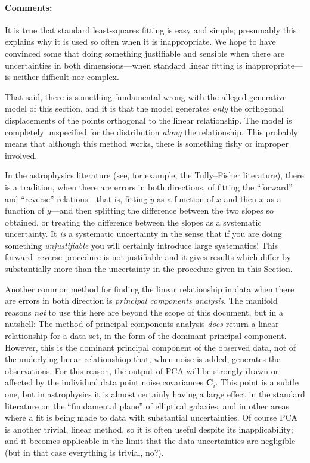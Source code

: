 \documentclass[12pt]{article}
\newcommand{\sectionname}{Section}
\newcommand{\commentsname}{Comments}
\newenvironment{comments}{\paragraph{\commentsname:}}{}
\newcommand{\mmatrix}[1]{\boldsymbol{#1}}
\newcommand{\mC}{\mmatrix{C}}
\begin{document}
\begin{comments}
It is true that standard least-squares fitting is easy and simple;
presumably this explains why it is used so often when it is
inappropriate.  We hope to have convinced some that doing something
justifiable and sensible when there are uncertainties in both
dimensions---when standard linear fitting is inappropriate---is
neither difficult nor complex.

That said, there is something fundamental wrong with the alleged
generative model of this section, and it is that the model generates
\emph{only} the orthogonal displacements of the points orthogonal to
the linear relationship.  The model is completely unspecified for the
distribution \emph{along} the relationship.  This probably means that
although this method works, there is something fishy or improper
involved.

In the astrophysics literature (see, for example, the Tully--Fisher
literature), there is a tradition, when there are errors in both
directions, of fitting the ``forward'' and ``reverse''
relations---that is, fitting $y$ as a function of $x$ and then $x$ as
a function of $y$---and then splitting the difference between the two
slopes so obtained, or treating the difference between the slopes as a
systematic uncertainty.  It \emph{is} a systematic uncertainty in the
sense that if you are doing something \emph{unjustifiable} you will
certainly introduce large systematics!  This forward--reverse
procedure is not justifiable and it gives results which differ by
substantially more than the uncertainty in the procedure given in this
\sectionname.

Another common method for finding the linear relationship in data when
there are errors in both direction is \emph{principal components
  analysis}.  The manifold reasons \emph{not} to use this here are
beyond the scope of this document, but in a nutshell: The method of
principal components analysis \emph{does} return a linear relationship
for a data set, in the form of the dominant principal component.
However, this is the dominant principal component of the observed
data, not of the underlying linear relationshiop that, when noise is
added, generates the observations.  For this reason, the output of PCA
will be strongly drawn or affected by the individual data point noise
covariances $\mC_i$.  This point is a subtle one, but in astrophysics
it is almost certainly having a large effect in the standard
literature on the ``fundamental plane'' of elliptical galaxies, and in
other areas where a fit is being made to data with substantial
uncertainties.  Of course PCA is another trivial, linear method, so it
is often useful despite its inapplicability; and it becomes applicable
in the limit that the data uncertainties are negligible (but in that
case everything is trivial, no?).
\end{comments}
\end{document}

